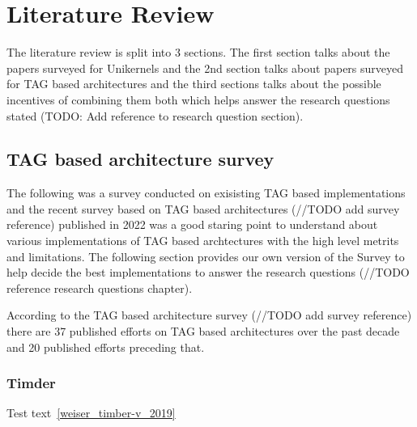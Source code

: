 
\chapter{Literature Review}  %

\ifpdf
    \graphicspath{{LiteratureReview/Figs/Raster/}{LiteratureReview/Figs/PDF/}{LiteratureReview/Figs/}}
\else
    \graphicspath{{LiteratureReview/Figs/Vector/}{LiteratureReview/Figs/}}
\fi


The literature review is split into 3 sections. The first section talks about the papers surveyed 
for Unikernels and the 2nd section talks about papers surveyed for TAG based architectures and 
the third sections talks about the possible incentives of combining them both which helps 
answer the research questions stated (TODO: Add reference to research question section). 

\section[TAG based architecture survey]{TAG based architecture survey}   
The following was a survey conducted on exisisting TAG based implementations and the 
recent survey based on TAG based architectures (//TODO add survey reference) published
in 2022 was a good staring point to understand about various implementations of TAG
based archtectures with the high level metrits and limitations. The following section 
provides our own version of the Survey to help decide the best implementations 
to answer the research questions (//TODO reference research questions chapter). 
 
According to the TAG based architecture survey (//TODO add survey reference) there are 37 published
efforts on TAG based architectures over the past decade and 20 published efforts preceding that. 

\subsection{Timder}
 Test text~\ref{weiser_timber-v_2019}
	

